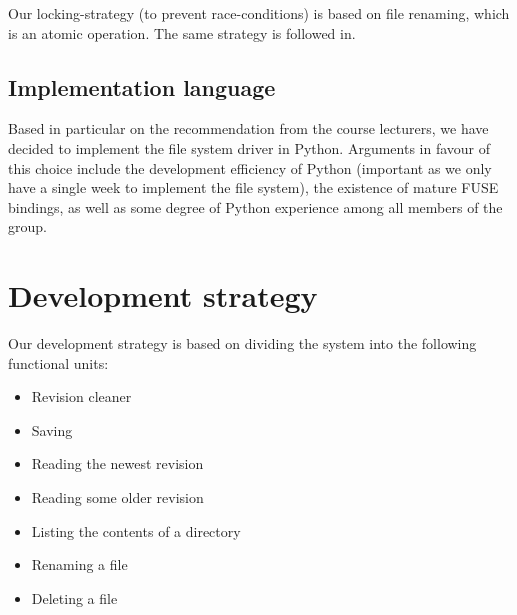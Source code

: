 \documentclass[12pt]{article}
\begin{document}
Our locking-strategy (to prevent race-conditions) is based on file
renaming, which is an atomic operation.  The same strategy is followed
in.\cite{Santry:1999gf}

\subsection{Implementation language}

Based in particular on the recommendation from the course lecturers,
we have decided to implement the file system driver in Python.
Arguments in favour of this choice include the development efficiency
of Python (important as we only have a single week to implement the
file system), the existence of mature FUSE bindings, as well as some
degree of Python experience among all members of the group.

\section{Development strategy}

Our development strategy is based on dividing the system into the
following functional units:

\begin{itemize}
\item Revision cleaner
\item Saving
\item Reading the newest revision
\item Reading some older revision
\item Listing the contents of a directory
\item Renaming a file
\item Deleting a file
\end{itemize}



 
\end{document}
